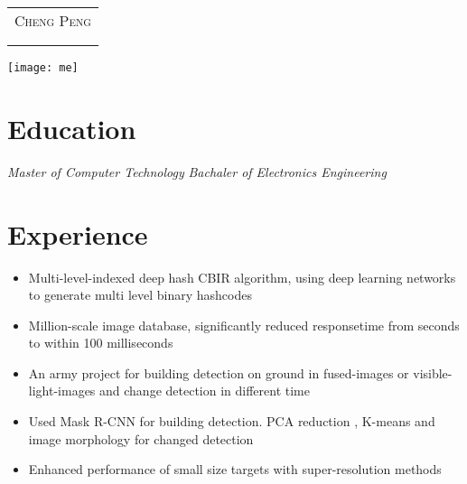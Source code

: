 \documentclass{resume}
\begin{document}

\begin{minipage}{0.7\textwidth}
  \Large{
    \begin{tabu}  { l }
      \scshape{Cheng \quad  Peng} \\
       \\
       \\
    \end{tabu}
  }
\end{minipage}
\begin{minipage}{0.3\textwidth}
  \raggedleft
  \texttt{[image: me]}
\end{minipage}

\section{Education}
\textit{Master of Computer Technology } 
\textit{Bachaler of Electronics Engineering }

\section{Experience}

\begin{itemize}[topsep = 0 pt, partopsep = 0pt]
  \item Multi-level-indexed deep hash CBIR algorithm, using deep learning networks to generate multi level  binary hashcodes
  \item Million-scale image database, significantly reduced responsetime from seconds to within 100 milliseconds
\end{itemize}


\begin{itemize}[topsep = 0 pt, partopsep = 0pt]
  \item An army project for building detection on ground in fused-images or visible-light-images and change detection in different time
  \item Used Mask R-CNN for building detection. PCA reduction , K-means and image morphology for changed detection
  \item Enhanced performance of small size targets with super-resolution methods 
\end{itemize}
\end{document}
